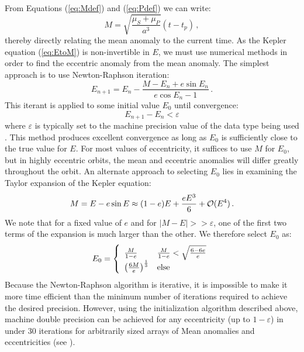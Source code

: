 From Equations (\ref{eq:Mdef}) and (\ref{eq:Pdef}) we can write:
\begin{equation}
M = \sqrt{\frac{\mu_S + \mu_P}{a^3}}(t - t_p) \, ,
\end{equation}
thereby directly relating the mean anomaly to the current time.  As the Kepler equation (\ref{eq:EtoM}) is non-invertible in $E$, we must use numerical methods in order to find the eccentric anomaly from the mean anomaly.  The simplest approach is to use Newton-Raphson iteration:
\begin{equation}\label{eq:NewtonRaphson}
E_{n+1} = E_n - \frac{M - E_n + e\sin E_n}{e\cos E_n - 1} \, .
\end{equation}
This iterant is applied to some initial value $E_0$ until convergence:
\begin{equation}
E_{n+1} - E_n < \varepsilon
\end{equation}
where $\varepsilon$ is typically set to the machine precision value of the data type being used \citep{moler2004numerical}.  This method produces excellent convergence as long as $E_0$ is sufficiently close to the true value for $E$.  For most values of eccentricity, it suffices to use $M$ for $E_0$, but in highly eccentric orbits, the mean and eccentric anomalies will differ greatly throughout the orbit.  An alternate approach to selecting $E_0$ lies in examining the Taylor expansion of the Kepler equation:
\begin{equation}
M = E - e\sin E \approx (1 - e)E + \frac{e E^3}{6} + \mathcal O(E^4) \,.
\end{equation}
We note that for a fixed value of $e$ and for $\vert M - E\vert >> \varepsilon$, one of the first two terms of the expansion is much larger than the other.  We therefore select $E_0$ as:
\begin{equation}\label{eq:E0selection}
E_0 = \left\{  
   \begin{array}{l l}
    \frac{M}{1 - e} & \frac{M}{1 - e} < \sqrt{\frac{6-6e}{e}}\\
   \left( \frac{6 M}{e} \right)^{\frac{1}{3}}& \mathrm{else}
    \end{array}
    \right.
\end{equation}
Because the Newton-Raphson algorithm is iterative, it is impossible to make it more time efficient than the minimum number of iterations required to achieve the desired precision.  However, using the initialization algorithm described above, machine double precision can be achieved for any eccentricity (up to $1 - \varepsilon$) in under 30 iterations for arbitrarily sized arrays of Mean anomalies and eccentricities (see ).

